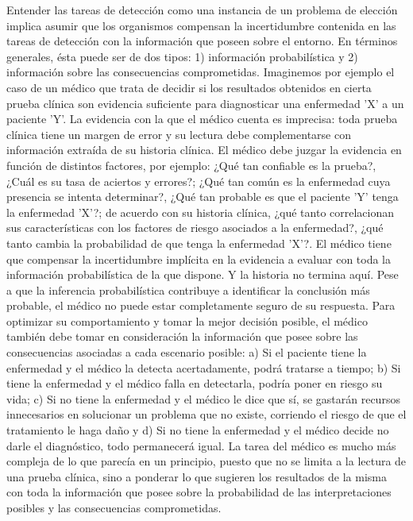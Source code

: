 Entender las tareas de detección como una instancia de un problema de elección implica asumir que los organismos compensan la incertidumbre contenida en las tareas de detección con la información que poseen sobre el entorno. En términos generales, ésta puede ser de dos tipos: 1) información probabilística y 2) información sobre las consecuencias comprometidas. Imaginemos por ejemplo el caso de un médico que trata de decidir si los resultados obtenidos en cierta prueba clínica son evidencia suficiente para diagnosticar una enfermedad 'X' a un paciente 'Y'. La evidencia con la que el médico cuenta es imprecisa: toda prueba clínica tiene un margen de error y su lectura debe complementarse con información extraída de su historia clínica. El médico debe juzgar la evidencia en función de distintos factores, por ejemplo: ¿Qué tan confiable es la prueba?, ¿Cuál es su tasa de aciertos y errores?; ¿Qué tan común es la enfermedad cuya presencia se intenta determinar?, ¿Qué tan probable es que el paciente 'Y' tenga la enfermedad 'X'?; de acuerdo con su historia clínica, ¿qué tanto correlacionan sus características con los factores de riesgo asociados a la enfermedad?, ¿qué tanto cambia la probabilidad de que tenga la enfermedad 'X'?. El médico tiene que compensar la incertidumbre implícita en la evidencia a evaluar con toda la información probabilística de la que dispone. Y la historia no termina aquí. Pese a que la inferencia probabilística contribuye a identificar la conclusión más probable, el médico no puede estar completamente seguro de su respuesta. Para optimizar su comportamiento y tomar la mejor decisión posible, el médico también debe tomar en consideración la información que posee sobre las consecuencias asociadas a cada escenario posible: a) Si el paciente tiene la enfermedad y el médico la detecta acertadamente, podrá tratarse a tiempo; b) Si tiene la enfermedad y el médico falla en detectarla, podría poner en riesgo su vida; c) Si no tiene la enfermedad y el médico le dice que sí, se gastarán recursos innecesarios en solucionar un problema que no existe, corriendo el riesgo de que el tratamiento le haga daño y d) Si no tiene la enfermedad y el médico decide no darle el diagnóstico, todo permanecerá igual. La tarea del médico es mucho más compleja de lo que parecía en un principio, puesto que no se limita a la lectura de una prueba clínica, sino a ponderar lo que sugieren los resultados de la misma con toda la información que posee sobre la probabilidad de las interpretaciones posibles y las consecuencias comprometidas.\\

